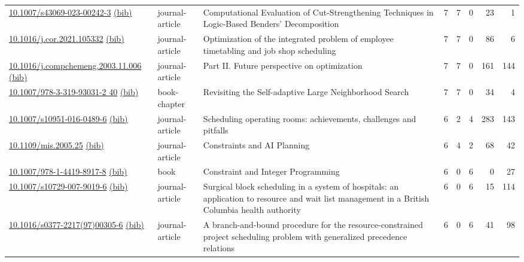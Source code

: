 {\begin{longtable}{p{5cm}lp{11cm}rrrrr}
\href{http://dx.doi.org/10.1007/s43069-023-00242-3}{10.1007/s43069-023-00242-3} \href{https://www.doi2bib.org/bib/10.1007/s43069-023-00242-3}{(bib)} & journal-article & Computational Evaluation of Cut-Strengthening Techniques in Logic-Based Benders' Decomposition & 7 & 7 & 0 & 23 & 1 \\
\href{http://dx.doi.org/10.1016/j.cor.2021.105332}{10.1016/j.cor.2021.105332} \href{https://www.doi2bib.org/bib/10.1016/j.cor.2021.105332}{(bib)} & journal-article & Optimization of the integrated problem of employee timetabling and job shop scheduling & 7 & 7 & 0 & 86 & 6 \\
\href{http://dx.doi.org/10.1016/j.compchemeng.2003.11.006}{10.1016/j.compchemeng.2003.11.006} \href{https://www.doi2bib.org/bib/10.1016/j.compchemeng.2003.11.006}{(bib)} & journal-article & Part II. Future perspective on optimization & 7 & 7 & 0 & 161 & 144 \\
\href{http://dx.doi.org/10.1007/978-3-319-93031-2_40}{10.1007/978-3-319-93031-2 40} \href{https://www.doi2bib.org/bib/10.1007/978-3-319-93031-2_40}{(bib)} & book-chapter & Revisiting the Self-adaptive Large Neighborhood Search & 7 & 7 & 0 & 34 & 4 \\
\href{http://dx.doi.org/10.1007/s10951-016-0489-6}{10.1007/s10951-016-0489-6} \href{https://www.doi2bib.org/bib/10.1007/s10951-016-0489-6}{(bib)} & journal-article & Scheduling operating rooms: achievements, challenges and pitfalls & 6 & 2 & 4 & 283 & 143 \\
\href{http://dx.doi.org/10.1109/mis.2005.25}{10.1109/mis.2005.25} \href{https://www.doi2bib.org/bib/10.1109/mis.2005.25}{(bib)} & journal-article & Constraints and AI Planning & 6 & 4 & 2 & 68 & 42 \\
\href{http://dx.doi.org/10.1007/978-1-4419-8917-8}{10.1007/978-1-4419-8917-8} \href{https://www.doi2bib.org/bib/10.1007/978-1-4419-8917-8}{(bib)} & book & Constraint and Integer Programming & 6 & 0 & 6 & 0 & 27 \\
\href{http://dx.doi.org/10.1007/s10729-007-9019-6}{10.1007/s10729-007-9019-6} \href{https://www.doi2bib.org/bib/10.1007/s10729-007-9019-6}{(bib)} & journal-article & Surgical block scheduling in a system of hospitals: an application to resource and wait list management in a British Columbia health authority & 6 & 0 & 6 & 15 & 114 \\
\href{http://dx.doi.org/10.1016/s0377-2217(97)00305-6}{10.1016/s0377-2217(97)00305-6} \href{https://www.doi2bib.org/bib/10.1016/s0377-2217(97)00305-6}{(bib)} & journal-article & A branch-and-bound procedure for the resource-constrained project scheduling problem with generalized precedence relations & 6 & 0 & 6 & 41 & 98 \\

\end{longtable}}

